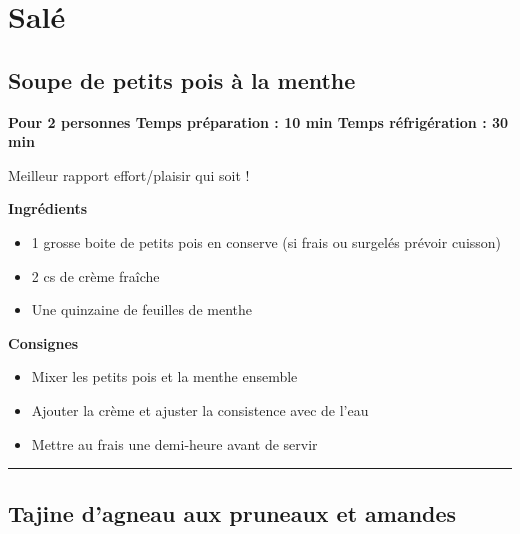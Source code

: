 \documentclass[]{book}
\providecommand{\tightlist}{%
  \setlength{\itemsep}{0pt}\setlength{\parskip}{0pt}}
\begin{document}
\section*{Salé}\label{saluxe9-1}

\subsection*{\texorpdfstring{{Soupe de petits pois à la
menthe}}{Soupe de petits pois à la menthe}}\label{soupe-de-petits-pois-uxe0-la-menthe}

\begin{salebox}
\textbf{Pour 2 personnes \textbar{} Temps préparation : 10 min
\textbar{} Temps réfrigération : 30 min}

Meilleur rapport effort/plaisir qui soit !
\end{salebox}

 \textbf{Ingrédients}

\begin{itemize}
\tightlist
\item
  1 grosse boite de petits pois en conserve (si frais ou surgelés
  prévoir cuisson)
\item
  2 cs de crème fraîche
\item
  Une quinzaine de feuilles de menthe
\end{itemize}

\textbf{Consignes}

\begin{itemize}
\tightlist
\item
  Mixer les petits pois et la menthe ensemble
\item
  Ajouter la crème et ajuster la consistence avec de l'eau
\item
  Mettre au frais une demi-heure avant de servir
\end{itemize}

\begin{center}\rule{0.5\linewidth}{0.5pt}\end{center}

\subsection*{\texorpdfstring{{Tajine d'agneau aux pruneaux et
amandes}}{Tajine d'agneau aux pruneaux et amandes}}\label{tajine-dagneau-aux-pruneaux-et-amandes}
\end{document}
